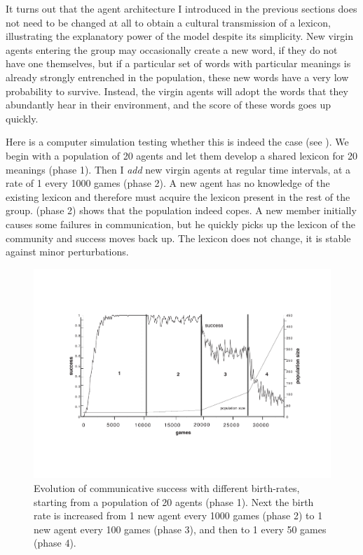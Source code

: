 It turns out that the agent architecture I introduced
in the previous sections does not 
need to be changed at all to obtain a cultural 
transmission of a lexicon, illustrating the explanatory 
power of the model despite its simplicity. New virgin agents
entering the group may occasionally create a new word, 
if they do not have one themselves, but if a 
particular set of words with particular meanings
is already strongly entrenched in the population, these
new words have a very low probability to survive.
Instead, the virgin agents will adopt the words
that they abundantly hear in their environment, and the
score of these words goes up quickly. 

Here is a computer simulation testing whether this 
is indeed the case (see ). 
We begin with a population of 20 agents and let them develop a 
shared lexicon for 20 meanings (phase 1). Then I {\itshape add}
new virgin agents at regular time intervals, at a rate 
of 1 every 1000 games (phase 2). A new 
agent has no knowledge of the existing lexicon and
therefore must acquire the lexicon present in the rest
of the group.  (phase 2) shows that the 
population indeed copes. A new member initially causes 
some failures in communication, but he quickly
picks up the lexicon of the community and success
moves back up. The lexicon does not change, it is 
stable against minor perturbations. 

\begin{figure}[htbp]
  \centerline{\includegraphics[width=.70\textwidth]{chap5/figs/birth}}
\caption{\label{birth} Evolution of communicative 
success with different birth-rates, starting from a
population of 20 agents (phase 1). 
Next the birth rate is increased from 1 new agent 
every 1000 games (phase 2) to 
1 new agent every 100 games (phase 3), 
and then to 1 every 50 games (phase 4).}
\end{figure}

